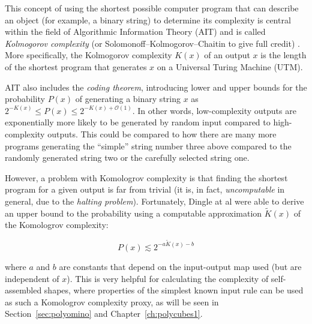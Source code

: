 This concept of using the shortest possible computer program that can describe an object (for example, a binary string) to determine its complexity is central within the field of Algorithmic Information Theory (AIT) and is called \emph{Kolmogorov complexity} (or Solomonoff–Kolmogorov–Chaitin to give full credit) \cite{LiMing2019AitK}. More specifically, the Kolmogorov complexity \(K(x)\) of an output \(x\) is the length of the shortest program that generates \(x\) on a Universal Turing Machine (UTM).

AIT also includes the \emph{coding theorem}, introducing lower and upper bounds for the probability \(P(x)\) of generating a binary string \(x\) as \(2^{-K(x)} \le P(x) \le 2^{-K(x) + \mathcal{O} (1)}\). In other words, low-complexity outputs are exponentially more likely to be generated by random input compared to high-complexity outputs. This could be compared to how there are many more programs generating the ``simple'' string number three above compared to the randomly generated string two or the carefully selected string one.

However, a problem with Komologrov complexity is that finding the shortest program for a given output is far from trivial (it is, in fact, \emph{uncomputable} in general, due to the \emph{halting problem}). Fortunately, Dingle at al \cite{dingle2018input} were able to derive an upper bound to the probability using a computable approximation \(\widetilde{K}(x)\) of the Komologrov complexity:

\[
  P(x) \lesssim 2^{-a\widetilde{K}(x) -b}
\]

where \(a\) and \(b\) are constants that depend on the input-output map used (but are independent of \(x\)). This is very helpful for calculating the complexity of self-assembled shapes, where properties of the simplest known input rule can be used as such a Komologrov complexity proxy, as  will be seen in Section~\ref{sec:polyomino} and Chapter~\ref{ch:polycubes1}.




